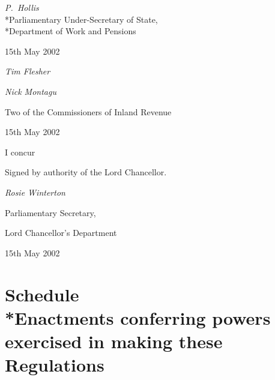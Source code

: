 \documentclass[12pt,a4paper]{article}
\begin{document}
{\raggedleft
\emph{P.~Hollis}\\*Parliamentary Under-Secretary of State,\\*Department of Work and Pensions

}

15th May 2002

\bigskip

{\raggedleft
\emph{Tim Flesher}

\emph{Nick Montagu}

Two of the Commissioners of Inland Revenue

}

15th May 2002

\bigskip

I concur

Signed by authority of the Lord Chancellor.

{\raggedleft
\emph{Rosie Winterton}

Parliamentary Secretary,

Lord Chancellor’s Department

}

15th May 2002

\small

\part[Schedule --- Enactments conferring powers exercised in making these Regulations]{Schedule\\*Enactments conferring powers exercised in making these Regulations}
\end{document}
